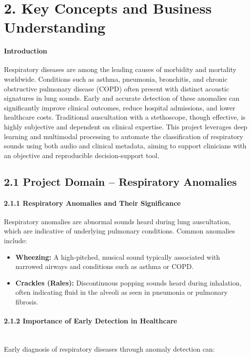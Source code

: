 \section*{2. Key Concepts and Business Understanding}

\paragraph{Introduction\\}
Respiratory diseases are among the leading causes of morbidity and mortality worldwide. Conditions such as asthma, pneumonia, bronchitis, and chronic obstructive pulmonary disease (COPD) often present with distinct acoustic signatures in lung sounds. Early and accurate detection of these anomalies can significantly improve clinical outcomes, reduce hospital admissions, and lower healthcare costs. Traditional auscultation with a stethoscope, though effective, is highly subjective and dependent on clinical expertise. This project leverages deep learning and multimodal processing to automate the classification of respiratory sounds using both audio and clinical metadata, aiming to support clinicians with an objective and reproducible decision-support tool.

\subsection*{2.1 Project Domain – Respiratory Anomalies}

\paragraph{2.1.1 Respiratory Anomalies and Their Significance\\}
Respiratory anomalies are abnormal sounds heard during lung auscultation, which are indicative of underlying pulmonary conditions. Common anomalies include:

\begin{itemize}
    \item \textbf{Wheezing:} A high-pitched, musical sound typically associated with narrowed airways and conditions such as asthma or COPD.
    \item \textbf{Crackles (Rales):} Discontinuous popping sounds heard during inhalation, often indicating fluid in the alveoli as seen in pneumonia or pulmonary fibrosis.
\end{itemize}

\paragraph{2.1.2 Importance of Early Detection in Healthcare\\\\}
Early diagnosis of respiratory diseases through anomaly detection can:

